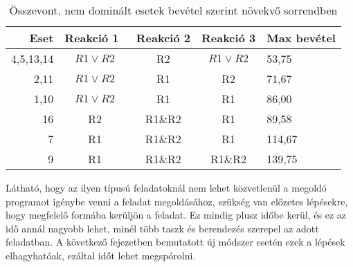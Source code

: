 \begin{table}[H]
	\begin{center}
		\caption{Összevont, nem dominált esetek bevétel szerint növekvő sorrendben}
		\captionsetup[table]{skip=10pt}	
		\label{tabla3}	
		\begin{tabular}{r|ccc|l}
		Eset      & Reakció 1~ & Reakció 2 & Reakció 3 & Max bevétel  \\ 
		\hline
		4,5,13,14 & $R1 \vee R2$      & R2 & $R1 \vee R2$     & 53,75        \\
		2,11      & $R1 \vee R2$      & R1        & R2        & 71,67        \\
		1,10      & $R1 \vee R2$      & R1        & R1        & 86,00        \\
		16        & R2         & R1\&R2    & R1        & 89,58        \\
		7         & R1         & R1\&R2    & R1        & 114,67       \\
		9         & R1         & R1\&R2    & R1\&R2    & 139,75      
		\end{tabular}
	\end{center}
\end{table}

Látható, hogy az ilyen típusú feladatoknál nem lehet közvetlenül a megoldó programot igénybe venni a feladat megoldásához, szükség van előzetes lépésekre, hogy megfelelő formába kerüljön a feladat.
Ez mindig plusz időbe kerül, és ez az idő annál nagyobb lehet, minél több taszk és berendezés szerepel az adott feladatban.
A következő fejezetben bemutatott új módszer esetén ezek a lépések elhagyhatóak, ezáltal időt lehet megspórolni.